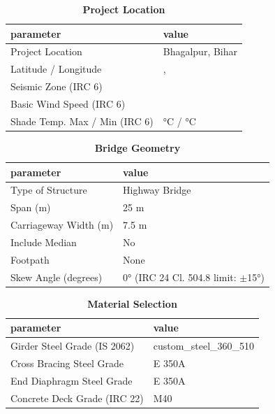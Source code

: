 \documentclass[12pt,a4paper]{report}
\numberwithin{table}{chapter}
\numberwithin{figure}{chapter}
\begin{document}
\begin{table}[H]
\caption{\textbf{Project Location}}
\label{subsec:project-location}
\begin{tabular}{|L{5.5cm}|L{8.5cm}|}
\hline
\textbf{parameter} & \textbf{value} \\
\hline
\textnormal{Project Location} & Bhagalpur, Bihar \\
\hline
\textnormal{Latitude / Longitude} & ,  \\
\hline
\textnormal{Seismic Zone (IRC 6)} &  \\
\hline
\textnormal{Basic Wind Speed (IRC 6)} &  \\
\hline
\textnormal{Shade Temp. Max / Min (IRC 6)} &  °C /  °C \\
\hline
\end{tabular}
\vspace{0.4cm}
\end{table}

\begin{table}[H]
\caption{\textbf{Bridge Geometry}}
\label{subsec:bridge-geometry}
\begin{tabular}{|L{5.5cm}|L{8.5cm}|}
\hline
\textbf{parameter} & \textbf{value} \\
\hline
\textnormal{Type of Structure} & Highway Bridge \\
\hline
\textnormal{Span (m)} & 25 m \\
\hline
\textnormal{Carriageway Width (m)} & 7.5 m \\
\hline
\textnormal{Include Median} & No \\
\hline
\textnormal{Footpath} & None \\
\hline
\textnormal{Skew Angle (degrees)} & 0° (IRC 24 Cl. 504.8 limit: $\pm$15°) \\
\hline
\end{tabular}
\end{table}
\vspace{0.4cm}

\begin{table}[H]
\caption{\textbf{Material Selection}}
\label{subsec:material}
\begin{tabular}{|L{5.5cm}|L{8.5cm}|}
\hline
\textbf{parameter} & \textbf{value} \\
\hline
\textnormal{Girder Steel Grade (IS 2062)} & custom\_\allowbreak{}steel\_\allowbreak{}360\_\allowbreak{}510 \\
\hline
\textnormal{Cross Bracing Steel Grade} & E 350A \\
\hline
\textnormal{End Diaphragm Steel Grade} & E 350A \\
\hline
\textnormal{Concrete Deck Grade (IRC 22)} & M40 \\
\hline
\end{tabular}
\end{table}
\vspace{0.4cm}
\end{document}

